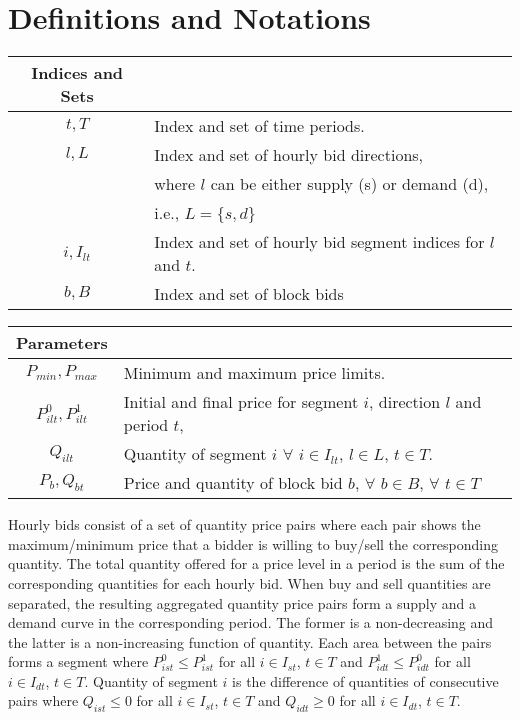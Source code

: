\documentclass[conference]{IEEEtran}
\begin{document}
\section{Definitions and Notations}

\begin {table}[h!]
\begin{tabular}{c l}
Indices and Sets & \\
\hline
$t,T $& Index and set of time periods. \\
$l, L$ & Index and set of hourly bid directions, \\
&where $l$ can be either supply (s) or demand (d), \\
&i.e., $L=\{s,d\}$ \\
$i,I_{lt} $& Index and set of hourly bid segment indices for $l$ and $t$. \\
$b,B$ & Index and set of block bids \\
\end{tabular}
\end{table}


\begin {table}[h!]
\begin{tabular}{c l}
Parameters &  \\
\hline
$P_{min},P_{max}$ & Minimum and maximum price limits. \\
$P^0_{ilt},P^1_{ilt}$ & Initial and final price for segment $i$, direction $l$ and period $t$, \\
$Q_{ilt}$ & Quantity of segment $i$ $\forall$ $i\in I_{lt}$, $l \in L$, $t\in T$.  \\
$P_b,Q_{bt}$ & Price and quantity of block bid $b$, $\forall$ $b\in B$, $\forall$ $t\in T $ \\
\end{tabular}
\end{table}

Hourly bids consist of a set of quantity price pairs where each pair shows the maximum/minimum price that a bidder is willing to buy/sell the corresponding quantity. The total quantity offered for a price level in a period is the sum of the corresponding quantities for each hourly bid. When buy and sell quantities are separated, the resulting aggregated quantity price pairs form a supply and a demand curve in the corresponding period. The former is a non-decreasing and the latter is a non-increasing function of quantity. Each area between the pairs forms a segment where $P^0_{ist} \leq P^1_{ist}$ for all $i\in I_{st}$, $t\in T$ and $P^1_{idt} \leq P^0_{idt}$ for all $i\in I_{dt}$, $t\in T$. Quantity of segment $i$ is the difference of quantities of consecutive pairs where $Q_{ist} \leq 0$ for all $i\in I_{st}$, $t\in T$ and $Q_{idt} \geq 0$ for all $i\in I_{dt}$, $t\in T$.
\end{document}
